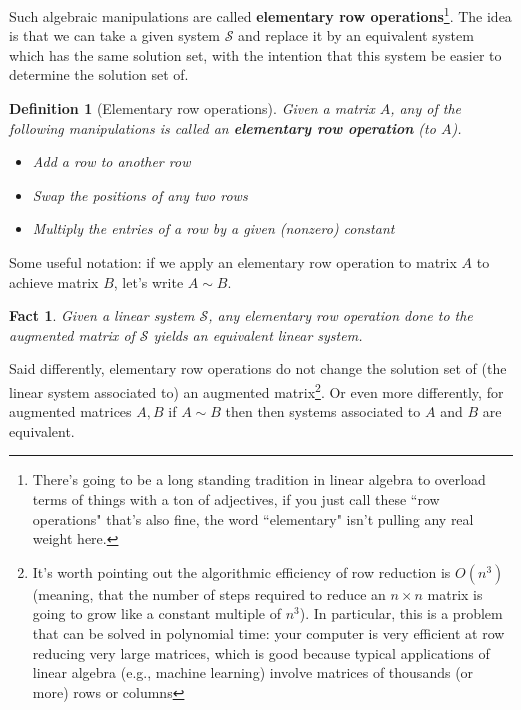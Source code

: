 \documentclass[12pt]{article}
\numberwithin{equation}{subsection}
\numberwithin{figure}{subsection}
\newtheorem{defn}[subsection]{Definition}
\newtheorem{fact}[subsection]{Fact}
\theoremstyle{note}
\begin{document}
Such algebraic manipulations are called  \textbf{elementary row operations}\footnote{There's going to be a long standing tradition in linear algebra to overload terms of things with a ton of adjectives, if you just call these ``row operations" that's also fine, the word ``elementary" isn't pulling any real weight here.}. The idea is that we can take a given system $\mathcal{S}$ and replace it by an equivalent system which has the same solution set, with the intention that this system be easier to determine the solution set of. 

\begin{defn}[Elementary row operations] Given a matrix $A$, any of the following manipulations is called an \textbf{elementary row operation} (to $A$). 

\begin{itemize}
	\item Add a row to another row
	\item Swap the positions of any two rows
	\item Multiply the entries of a row by a given (nonzero) constant
\end{itemize}
\end{defn}

Some useful notation: if we apply an elementary row operation to matrix $A$ to achieve matrix $B$, let's write $A\sim B$. 
\begin{fact}
	Given a linear system $\mathcal{S}$, any elementary row operation done to the augmented matrix of $\mathcal{S}$ yields an equivalent linear system.
\end{fact}
Said differently, elementary row operations do not change the solution set of (the linear system associated to) an augmented matrix\footnote{It's worth pointing out the algorithmic efficiency of row reduction is $O(n^3)$ (meaning, that the number of steps required to reduce an $n\times n$ matrix is going to grow like a constant multiple of $n^3$). In particular, this is a problem that can be solved in polynomial time: your computer is very efficient at row reducing very large matrices, which is good because typical applications of linear algebra (e.g., machine learning) involve matrices of thousands (or more) rows or columns}. Or even more differently, for augmented matrices $A,B$ if $A\sim B$ then then systems associated to $A$ and $B$ are equivalent. 
\end{document}
